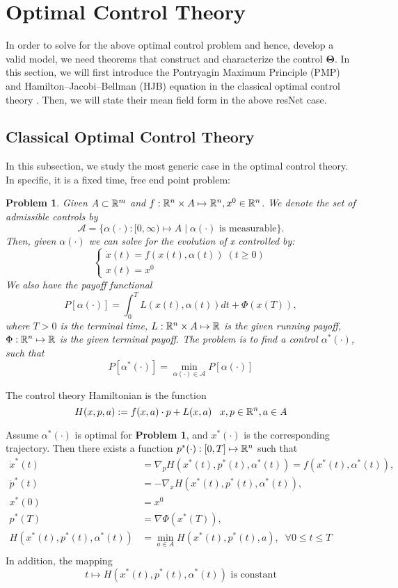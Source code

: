 \section{Optimal Control Theory}
In order to solve for the above optimal control problem and hence, develop a valid model, we need theorems that construct and characterize the control $\bm{\Theta}$. In this section, we will first introduce the Pontryagin Maximum Principle (PMP) and Hamilton–Jacobi–Bellman (HJB) equation in the classical optimal control theory \cite{bensoussan2013mean}. Then, we will state their mean field form in the above resNet case.
\subsection{Classical Optimal Control Theory}
In this subsection, we study the most generic case in the optimal control theory. In specific, it is a fixed time, free end point problem:
\newtheorem{problem}{Problem}
\label{problem_1}
\begin{problem}
Given $A \subset \mathbb{R}^m$ and $f: \mathbb{R}^n \times A \mapsto \mathbb{R}^n, x^0 \in \mathbb{R}^n$. We denote the set of admissible controls by $$\mathcal{A} = \{ \alpha(\cdot):[0,\infty) \mapsto A\; |\; \alpha(\cdot) \text{ is measurable}\}.$$
Then, given $\alpha (\cdot)$ we can solve for the evolution of x controlled by:$$
\begin{cases}
\dot x(t) = f(x(t),\alpha(t))\; (t\geq0)\\
x(t) = x^0
\end{cases}$$
We also have the payoff functional $$P[\alpha (\cdot)] = \int_{0}^{T} L(x(t),\alpha(t))dt+\Phi(x(T)),$$
where $T>0$ is the terminal time, $L: \mathbb{R}^n \times A \mapsto \mathbb{R}$ is the given running payoff, $\Phi:\mathbb{R}^n \mapsto \mathbb{R}$ is the given terminal payoff.
The problem is to find a control $\alpha^*(\cdot)$, such that $$P[\alpha^*(\cdot)] = \min _{\alpha(\cdot) \in \mathcal{A}} P[\alpha(\cdot)]$$
\end{problem}
\begin{definition}
The control theory Hamiltonian is the function $$H(x,p,a) := f(x,a) \cdot p +L(x,a) \; \; \; x,p\in \mathbb{R}^n, a \in A$$
\end{definition}
\begin{theorem}
Assume $\alpha^*(\cdot)$ is optimal for \textbf{Problem 1}, and $x^*(\cdot)$ is the corresponding trajectory. Then there exists a function $p^*(\cdot): [0,T] \mapsto \mathbb{R}^n$ such that $$\begin{aligned}
\dot x^*(t) &= \nabla_p H(x^*(t), p^*(t), \alpha^*(t)) = f(x^*(t), \alpha^*(t)),\\
\dot p^*(t) &= -\nabla_x H(x^*(t), p^*(t), \alpha^*(t)),\\
x^*(0) & = x^0\\
p^*(T) &= \nabla \Phi(x^*(T)),\\
H(x^*(t), p^*(t), \alpha^*(t)) &= \min _{a \in A} H(x^*(t), p^*(t), a), \; \; \forall 0 \leq t \leq T\\
\end{aligned}
$$
In addition, the mapping $$t \mapsto H(x^*(t), p^*(t), \alpha^*(t)) \text{ is constant}$$
\end{theorem}
